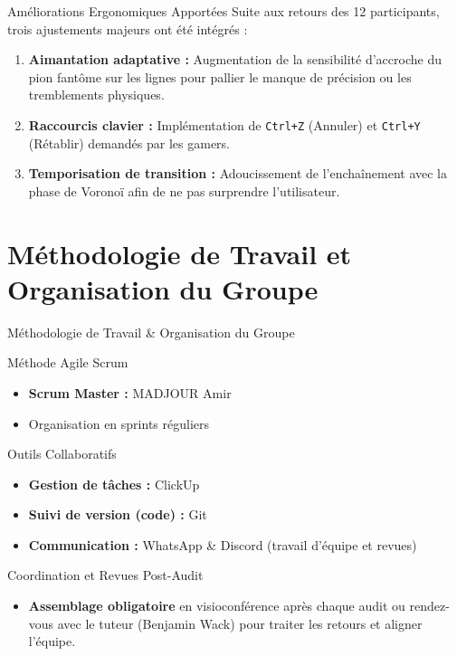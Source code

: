 \documentclass{beamer}
\begin{document}
\begin{frame}{Améliorations Ergonomiques Apportées}
    Suite aux retours des 12 participants, trois ajustements majeurs ont été intégrés :
    \begin{enumerate}
        \item \textbf{Aimantation adaptative :} Augmentation de la sensibilité d'accroche du pion fantôme sur les lignes pour pallier le manque de précision ou les tremblements physiques.
        \item \textbf{Raccourcis clavier :} Implémentation de \texttt{Ctrl+Z} (Annuler) et \texttt{Ctrl+Y} (Rétablir) demandés par les gamers.
        \item \textbf{Temporisation de transition :} Adoucissement de l'enchaînement avec la phase de Voronoï afin de ne pas surprendre l'utilisateur.
    \end{enumerate}
\end{frame}

\section{Méthodologie de Travail et Organisation du Groupe}

\begin{frame}{Méthodologie de Travail \& Organisation du Groupe}
    \begin{block}{Méthode Agile Scrum}
        \begin{itemize}
            \item \textbf{Scrum Master :} MADJOUR Amir
            \item Organisation en sprints réguliers
        \end{itemize}
    \end{block}
    \begin{block}{Outils Collaboratifs}
        \begin{itemize}
            \item \textbf{Gestion de tâches :} ClickUp
            \item \textbf{Suivi de version (code) :} Git
            \item \textbf{Communication :} WhatsApp \& Discord (travail d'équipe et revues)
        \end{itemize}
    \end{block}
    \begin{block}{Coordination et Revues Post-Audit}
        \begin{itemize}
            \item \textbf{Assemblage obligatoire} en visioconférence après chaque audit ou rendez-vous avec le tuteur (Benjamin Wack) pour traiter les retours et aligner l'équipe.
        \end{itemize}
    \end{block}
\end{frame}
\end{document}
